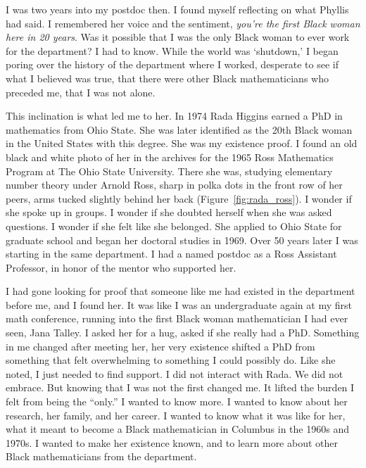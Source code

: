 \documentclass[pdflatex,sn-mathphys-num]{sn-jnl}%
\begin{document}
I was two years into my postdoc then. I found myself reflecting on what Phyllis had said. I remembered her voice and the sentiment, \emph{you're the first Black woman here in 20 years}. Was it possible that I was the only Black woman to ever work for the department? I had to know. While the world was `shutdown,' I began poring over the history of the department where I worked, desperate to see if what I believed was true, that there were other Black mathematicians who preceded me, that I was not alone.

This inclination is what led me to her. In 1974 Rada Higgins earned a PhD in mathematics from Ohio State. She was later identified as the 20th Black woman in the United States with this degree. She was my existence proof. I found an old black and white photo of her in the archives for the 1965 Ross Mathematics Program at The Ohio State University. There she was, studying elementary number theory under Arnold Ross, sharp in polka dots in the front row of her peers, arms tucked slightly behind her back (Figure~\ref{fig:rada_ross}). I wonder if she spoke up in groups. I wonder if she doubted herself when she was asked questions. I wonder if she felt like she belonged. She applied to Ohio State for graduate school and began her doctoral studies in 1969. Over 50 years later I was starting in the same department. I had a named postdoc as a Ross Assistant Professor, in honor of the mentor who supported her.

I had gone looking for proof that someone like me had existed in the department before me, and I found her. It was like I was an undergraduate again at my first math conference, running into the first Black woman mathematician I had ever seen, Jana Talley. I asked her for a hug, asked if she really had a PhD. Something in me changed after meeting her, her very existence shifted a PhD from something that felt overwhelming to something I could possibly do. Like she noted, I just needed to find support. I did not interact with Rada. We did not embrace. But knowing that I was not the first changed me. It lifted the burden I felt from being the ``only.'' I wanted to know more. I wanted to know about her research, her family, and her career. I wanted to know what it was like for her, what it meant to become a Black mathematician in Columbus in the 1960s and 1970s. I wanted to make her existence known, and to learn more about other Black mathematicians from the department.
\end{document}

